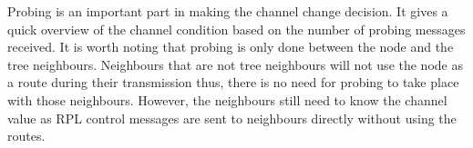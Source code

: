Probing is an important part in making the channel change decision. It gives a quick overview of the channel condition based on the number of probing messages received. It is worth noting that probing is only done between the node and the tree neighbours. Neighbours that are not tree neighbours will not use the node as a route during their transmission thus, there is no need for probing to take place with those neighbours. However, the neighbours still need to know the channel value as RPL control messages are sent to neighbours directly without using the routes.



